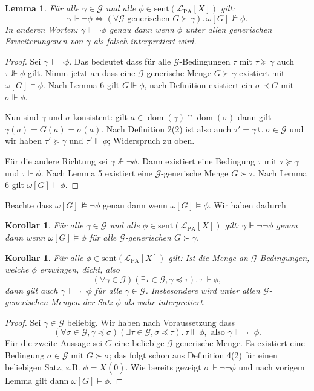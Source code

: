 \documentclass[nofonts]{uebung}
\newtheorem{lemma}[theorem]{Lemma}
\newtheorem{corollary}[theorem]{Korollar}
\DeclareMathOperator{\dom}{dom}
\begin{document}
\begin{lemma}
    Für alle $\gamma\in\mathcal G$ und alle $\phi\in \mathrm{sent}(\mathcal L_{\mathrm{PA}}[X])$ gilt:
    \[ \gamma\Vdash\neg\phi \iff (\forall\text{$\mathcal G$-generischen $G\succ\gamma$}).\, \omega[G]\not\vDash \phi. \]
    In anderen Worten: $\gamma\Vdash\neg\phi$ genau dann wenn $\phi$ unter allen generischen Erweiterungenen von $\gamma$ als falsch interpretiert wird.
\end{lemma}
\begin{proof}
    Sei $\gamma\Vdash\neg\phi$. Das bedeutet dass für alle $\mathcal G$-Bedingungen $\tau$ mit $\tau\succeq\gamma$ auch $\tau\not\Vdash \phi$ gilt.
    Nimm jetzt an dass eine $\mathcal G$-generische Menge $G\succ\gamma$ existiert mit $\omega[G]\vDash\phi$.
    Nach Lemma 6 gilt $G\Vdash\phi$, nach Definition existiert ein $\sigma\prec G$ mit $\sigma\Vdash\phi$.

    Nun sind $\gamma$ und $\sigma$ konsistent: gilt $a\in\dom(\gamma)\cap\dom(\sigma)$ dann gilt $\gamma(a)=G(a)=\sigma(a)$.
    Nach Definition 2(2) ist also auch $\tau'=\gamma\cup\sigma\in\mathcal G$ und wir haben $\tau'\succeq\gamma$ und $\tau'\Vdash\phi$; Widerspruch zu oben.

    Für die andere Richtung sei $\gamma\not\Vdash\neg\phi$. Dann existiert eine Bedingung $\tau$ mit $\tau\succeq\gamma$ und $\tau\Vdash\phi$.
    Nach Lemma 5 existiert eine $\mathcal G$-generische Menge $G\succ \tau$. Nach Lemma 6 gilt $\omega[G]\vDash\phi$.
\end{proof}

Beachte dass $\omega[G]\not\vDash\neg\phi$ genau dann wenn $\omega[G]\vDash\phi$. Wir haben dadurch
\begin{corollary}
    Für alle $\gamma\in\mathcal G$ und alle $\phi\in \mathrm{sent}(\mathcal L_{\mathrm{PA}}[X])$ gilt:
    $\gamma\Vdash\neg\neg\phi$ genau dann wenn $\omega[G]\vDash\phi$ für alle $\mathcal G$-generischen $G\succ\gamma$.
\end{corollary}
\begin{corollary}
    Für alle $\phi\in \mathrm{sent}(\mathcal L_{\mathrm{PA}}[X])$ gilt:
    Ist die Menge an $\mathcal G$-Bedingungen, welche $\phi$ erzwingen, dicht, also
    \[ (\forall \gamma\in\mathcal G)(\exists \tau\in\mathcal G, \gamma\preceq\tau).\,\tau\Vdash\phi, \]
    dann gilt auch $\gamma\Vdash\neg\neg \phi$ für alle $\gamma\in\mathcal G$.
    Insbesondere wird unter allen $\mathcal G$-generischen Mengen der Satz $\phi$ als wahr interpretiert.
\end{corollary}
\begin{proof}
    Sei $\gamma\in\mathcal G$ beliebig. Wir haben nach Voraussetzung dass 
    \[ (\forall\sigma\in\mathcal G, \gamma\preceq\sigma)(\exists \tau\in\mathcal G,\sigma\preceq\tau).\,\tau\Vdash\phi, \text{ also  } \gamma\Vdash\neg\neg\phi. \]
    Für die zweite Aussage sei $G$ eine beliebige $\mathcal G$-generische Menge.
    Es existiert eine Bedingung $\sigma\in\mathcal G$ mit $G\succ \sigma$; das folgt schon aus Definition 4(2) für einen beliebigen Satz, z.B. $\phi=X(\overline 0)$.
    Wie bereits gezeigt $\sigma\Vdash\neg\neg\phi$ und nach vorigem Lemma gilt dann $\omega[G]\vDash \phi$.
\end{proof}
\end{document}
